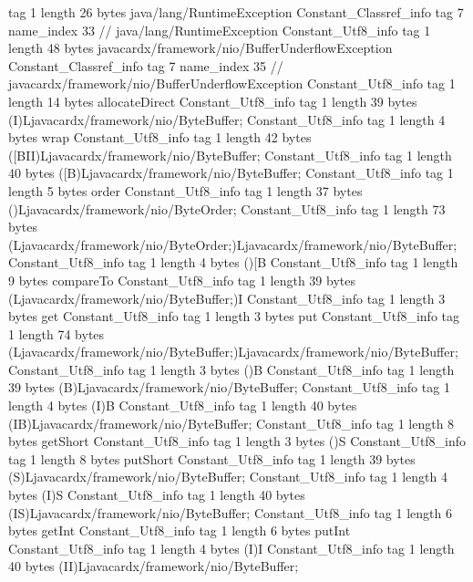 {{{			tag	1
			length	26
			bytes	java/lang/RuntimeException
		}
		Constant_Classref_info {
			tag	7
			name_index	33		// java/lang/RuntimeException
		}
		Constant_Utf8_info {
			tag	1
			length	48
			bytes	javacardx/framework/nio/BufferUnderflowException
		}
		Constant_Classref_info {
			tag	7
			name_index	35		// javacardx/framework/nio/BufferUnderflowException
		}
		Constant_Utf8_info {
			tag	1
			length	14
			bytes	allocateDirect
		}
		Constant_Utf8_info {
			tag	1
			length	39
			bytes	(I)Ljavacardx/framework/nio/ByteBuffer;
		}
		Constant_Utf8_info {
			tag	1
			length	4
			bytes	wrap
		}
		Constant_Utf8_info {
			tag	1
			length	42
			bytes	([BII)Ljavacardx/framework/nio/ByteBuffer;
		}
		Constant_Utf8_info {
			tag	1
			length	40
			bytes	([B)Ljavacardx/framework/nio/ByteBuffer;
		}
		Constant_Utf8_info {
			tag	1
			length	5
			bytes	order
		}
		Constant_Utf8_info {
			tag	1
			length	37
			bytes	()Ljavacardx/framework/nio/ByteOrder;
		}
		Constant_Utf8_info {
			tag	1
			length	73
			bytes	(Ljavacardx/framework/nio/ByteOrder;)Ljavacardx/framework/nio/ByteBuffer;
		}
		Constant_Utf8_info {
			tag	1
			length	4
			bytes	()[B
		}
		Constant_Utf8_info {
			tag	1
			length	9
			bytes	compareTo
		}
		Constant_Utf8_info {
			tag	1
			length	39
			bytes	(Ljavacardx/framework/nio/ByteBuffer;)I
		}
		Constant_Utf8_info {
			tag	1
			length	3
			bytes	get
		}
		Constant_Utf8_info {
			tag	1
			length	3
			bytes	put
		}
		Constant_Utf8_info {
			tag	1
			length	74
			bytes	(Ljavacardx/framework/nio/ByteBuffer;)Ljavacardx/framework/nio/ByteBuffer;
		}
		Constant_Utf8_info {
			tag	1
			length	3
			bytes	()B
		}
		Constant_Utf8_info {
			tag	1
			length	39
			bytes	(B)Ljavacardx/framework/nio/ByteBuffer;
		}
		Constant_Utf8_info {
			tag	1
			length	4
			bytes	(I)B
		}
		Constant_Utf8_info {
			tag	1
			length	40
			bytes	(IB)Ljavacardx/framework/nio/ByteBuffer;
		}
		Constant_Utf8_info {
			tag	1
			length	8
			bytes	getShort
		}
		Constant_Utf8_info {
			tag	1
			length	3
			bytes	()S
		}
		Constant_Utf8_info {
			tag	1
			length	8
			bytes	putShort
		}
		Constant_Utf8_info {
			tag	1
			length	39
			bytes	(S)Ljavacardx/framework/nio/ByteBuffer;
		}
		Constant_Utf8_info {
			tag	1
			length	4
			bytes	(I)S
		}
		Constant_Utf8_info {
			tag	1
			length	40
			bytes	(IS)Ljavacardx/framework/nio/ByteBuffer;
		}
		Constant_Utf8_info {
			tag	1
			length	6
			bytes	getInt
		}
		Constant_Utf8_info {
			tag	1
			length	6
			bytes	putInt
		}
		Constant_Utf8_info {
			tag	1
			length	4
			bytes	(I)I
		}
		Constant_Utf8_info {
			tag	1
			length	40
			bytes	(II)Ljavacardx/framework/nio/ByteBuffer;
}}}
